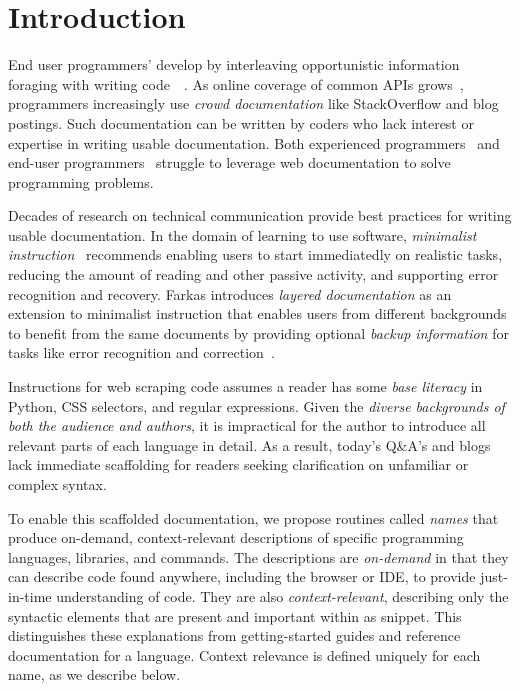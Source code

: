 \section{Introduction}

End user programmers' develop by interleaving opportunistic information foraging with writing code~\cite{brandt_two_2009}~\cite{brandt_example-centric_2010}.
As online coverage of common APIs grows~\cite{parnin_measuring_2011}, programmers increasingly use \emph{crowd documentation} like StackOverflow and blog postings.
Such documentation can be written by coders who lack interest or expertise in writing usable documentation.
Both experienced programmers~\cite{duala-ekoko_asking_2012} and end-user programmers~\cite{dorn_lost_2013}\cite{dorn_learning_2010} struggle to leverage web documentation to solve programming problems.

Decades of research on technical communication provide best practices for writing usable documentation.
In the domain of learning to use software, \emph{minimalist instruction}~\cite{carroll_nurnberg_1990} recommends enabling users to start immediatedly on realistic tasks, reducing the amount of reading and other passive activity, and supporting error recognition and recovery.
Farkas introduces \emph{layered documentation} as an extension to minimalist instruction that enables users from different backgrounds to benefit from the same documents by providing optional \emph{backup information} for tasks like error recognition and correction~\cite{farkas_layering_1998}.

Instructions for web scraping code assumes a reader has some \emph{base literacy} in Python, CSS selectors, and regular expressions.
Given the \emph{diverse backgrounds of both the audience and authors}, it is impractical for the author to introduce all relevant parts of each language in detail.
As a result, today's Q\&A's and blogs lack immediate scaffolding for readers seeking clarification on unfamiliar or complex syntax.

To enable this scaffolded documentation, we propose routines called \emph{\Glspl{name}} that produce on-demand, context-relevant descriptions of specific programming languages, libraries, and commands.
The descriptions are \emph{on-demand} in that they can describe code found anywhere, including the browser or IDE, to provide just-in-time understanding of code.
They are also \emph{context-relevant}, describing only the syntactic elements that are present and important within as snippet.
This distinguishes these explanations from getting-started guides and reference documentation for a language.
Context relevance is defined uniquely for each \gls{name}, as we describe below.


